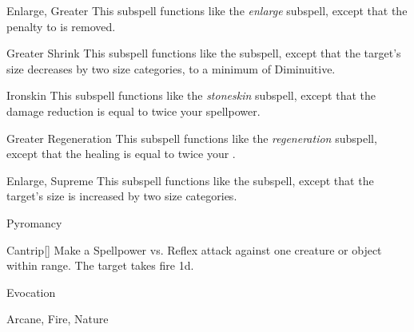 \begin{ability}[\nth{6}]{Enlarge, Greater}
This subspell functions like the \textit{enlarge} subspell, except that the penalty to  is removed.
\end{ability}
\vspace{0.25em}


\begin{ability}[\nth{6}]{Greater Shrink}
This subspell functions like the  subspell, except that the target's size decreases by two size categories, to a minimum of Diminuitive.
\end{ability}
\vspace{0.25em}


\begin{ability}[\nth{7}]{Ironskin}
This subspell functions like the \textit{stoneskin} subspell, except that the damage reduction is equal to twice your spellpower.
\end{ability}
\vspace{0.25em}


\begin{ability}[\nth{8}]{Greater Regeneration}
This subspell functions like the \textit{regeneration} subspell, except that the healing is equal to twice your .
\end{ability}
\vspace{0.25em}


\begin{ability}[\nth{9}]{Enlarge, Supreme}
This subspell functions like the  subspell, except that the target's size is increased by two size categories.
\end{ability}
\vspace{0.25em}

\newpage
\begin{spellsection}{Pyromancy}

\begin{spellheader}
\end{spellheader}


\begin{ability}{Cantrip}[]
Make a Spellpower vs. Reflex attack against one creature or object within \rngmed range.
\hit The target takes fire  \minus1d.
\end{ability}




 Evocation

 Arcane, Fire, Nature
\end{spellsection}


